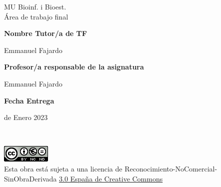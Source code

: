 \documentclass[a4paper,12pt]{article}
\newcommand{\thissupervisor}{Emmanuel Fajardo}
\newcommand{\thisPRA}{Emmanuel Fajardo}
\newcommand{\duedate}{12 de Enero 2023}
\begin{document}
\begin{minipage}{\paperwidth}
\begin{minipage}{0.45\paperwidth}
        {\fontsize{24pt}{1cm}\selectfont MU Bioinf. i Bioest.\\
        Área de trabajo final}\\
        
        \vspace{0.5cm}
        
        \fontsize{24pt}{1cm}\textbf{Nombre Tutor/a de TF}\\

        \vspace{0.1cm}

        {\fontsize{21pt}{1cm}\selectfont \thissupervisor}\\

        \vspace{0.1cm}

        \fontsize{24pt}{1cm}\textbf{Profesor/a responsable de la asignatura}\\

        \vspace{0.1cm}

        {\fontsize{21pt}{1cm}\selectfont \thisPRA}\\

        \vspace{0.5cm}

        \fontsize{21pt}{1cm}\textbf{Fecha Entrega}\\

        \vspace{0.5cm}

        {\fontsize{21pt}{1cm}\selectfont \duedate}

        \vspace{2cm}
    \end{minipage}
\end{minipage}

\pagebreak


\restoregeometry

\thispagestyle{UOCfooterpage}
~
\vfill
\begin{minipage}[l]{0.4\paperwidth}
    \includegraphics{assets/license.png}\\
    Esta obra está sujeta a una licencia de Reconocimiento-NoComercial-SinObraDerivada \href{http://creativecommons.org/licenses/by-nc-nd/3.0/es/
        }{3.0 España de Creative Commons}    
\end{minipage}
\pagebreak
\end{document}
